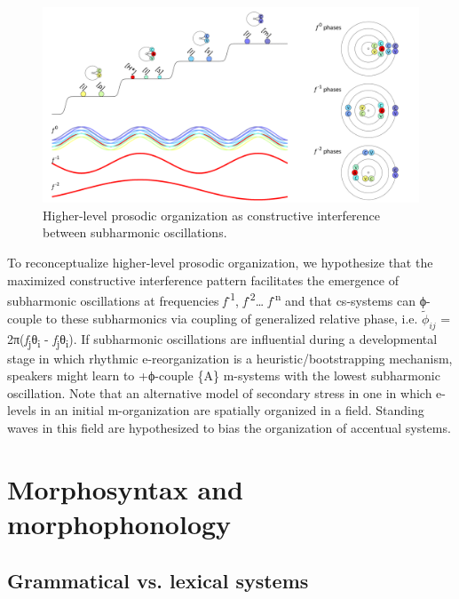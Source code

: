   
\begin{figure}
\includegraphics[width=\textwidth]{figures/Tilsen-img64.png}
\caption{Higher-level prosodic organization as constructive interference between subharmonic oscillations.}
\label{fig:4:14}
\end{figure}
 

  To reconceptualize higher-level prosodic organization, we hypothesize that the maximized constructive interference pattern facilitates the emergence of subharmonic oscillations at frequencies \textit{f}\textsuperscript{{}-1}, \textit{f}\textsuperscript{{}-2}… \textit{f}\textsuperscript{{}-n} and that cs-systems can ϕ-couple to these subharmonics via coupling of generalized relative phase, i.e. $\tilde{\phi}_{ij}$ = 2π(\textit{f}\textsubscript{j}θ\textsubscript{i} - \textit{f}\textsubscript{j}θ\textsubscript{i}). If subharmonic oscillations are influential during a developmental stage in which rhythmic e-reorganization is a heuristic/bootstrapping mechanism, speakers might learn to +ϕ-couple \{A\} m-systems with the lowest subharmonic oscillation. Note that an alternative model of secondary stress in one in which e-levels in an initial m-organization are spatially organized in a field. Standing waves in this field are hypothesized to bias the organization of accentual systems\citep{Tilsen2018b}.

\section{Morphosyntax and morphophonology}
\rohead{\headmark}
\subsection{Grammatical vs. lexical systems}

